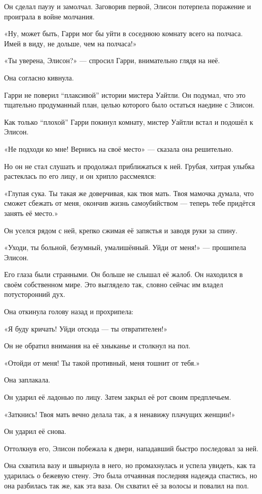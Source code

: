 \documentclass[a5paper, 9pt,
final, openany, twoside=true]{memoir}
\begin{document}
Он сделал паузу и замолчал. Заговорив первой, Элисон потерпела поражение и проиграла в войне молчания.

«Ну, может быть, Гарри мог бы уйти в соседнюю комнату всего на полчаса. Имей в виду, не дольше, чем на полчаса!»

«Ты уверена, Элисон?» — спросил Гарри, внимательно глядя на неё.

Она согласно кивнула.

Гарри не поверил ``плаксивой'' истории мистера Уайтли. Он подумал, что это тщательно продуманный план, целью которого было остаться наедине с Элисон.\bigskip

Как только ``плохой'' Гарри покинул комнату, мистер Уайтли встал и подошёл к Элисон.

«Не подходи ко мне! Вернись на своё место» — сказала она решительно.

Но он не стал слушать и продолжал приближаться к ней. Грубая, хитрая улыбка растеклась по его лицу, и он хрипло рассмеялся:

«Глупая сука. Ты такая же доверчивая, как твоя мать. Твоя мамочка думала, что сможет сбежать от меня, окончив жизнь самоубийством — теперь тебе придётся занять её место.»

Он уселся рядом с ней, крепко сжимая её запястья и заводя руки за спину.

«Уходи, ты больной, безумный, умалишённый. Уйди от меня!» — прошипела Элисон.

Его глаза были странными. Он больше не слышал её жалоб. Он находился в своём собственном мире. Это выглядело так, словно сейчас им владел потусторонний дух.

Она откинула голову назад и прохрипела:

«Я буду кричать! Уйди отсюда — ты отвратителен!»

Он не обратил внимания на её хныканье и столкнул на пол.

«Отойди от меня! Ты такой противный, меня тошнит от тебя.»

Она заплакала.

Он ударил её ладонью по лицу. Затем закрыл её рот своим предплечьем.

«Заткнись! Твоя мать вечно делала так, а я ненавижу плачущих женщин!»

Он ударил её снова.

Оттолкнув его, Элисон побежала к двери, нападавший быстро последовал за ней.

Она схватила вазу и швырнула в него, но промахнулась и успела увидеть, как та ударилась о бежевую стену. Это была отчаянная последняя надежда спастись, но она разбилась так же, как эта ваза. Он схватил её за волосы и повалил на пол.\bigskip
\end{document}
